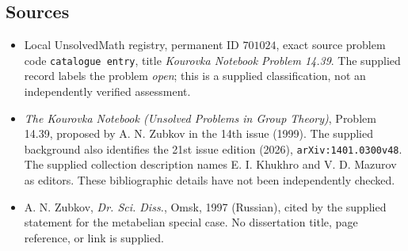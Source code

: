 \documentclass[11pt]{article}
\begin{document}
\subsection{Sources}
\begin{itemize}
\item Local UnsolvedMath registry, permanent ID \(701024\), exact source problem code \texttt{catalogue entry}, title \emph{Kourovka Notebook Problem 14.39}. The supplied record labels the problem \emph{open}; this is a supplied classification, not an independently verified assessment.
\item \emph{The Kourovka Notebook (Unsolved Problems in Group Theory)}, Problem 14.39, proposed by A. N. Zubkov in the 14th issue (1999). The supplied background also identifies the 21st issue edition (2026), \texttt{arXiv:1401.0300v48}. The supplied collection description names E. I. Khukhro and V. D. Mazurov as editors. These bibliographic details have not been independently checked.
\item A. N. Zubkov, \emph{Dr. Sci. Diss.}, Omsk, 1997 (Russian), cited by the supplied statement for the metabelian special case. No dissertation title, page reference, or link is supplied.
\end{itemize}
\end{document}
